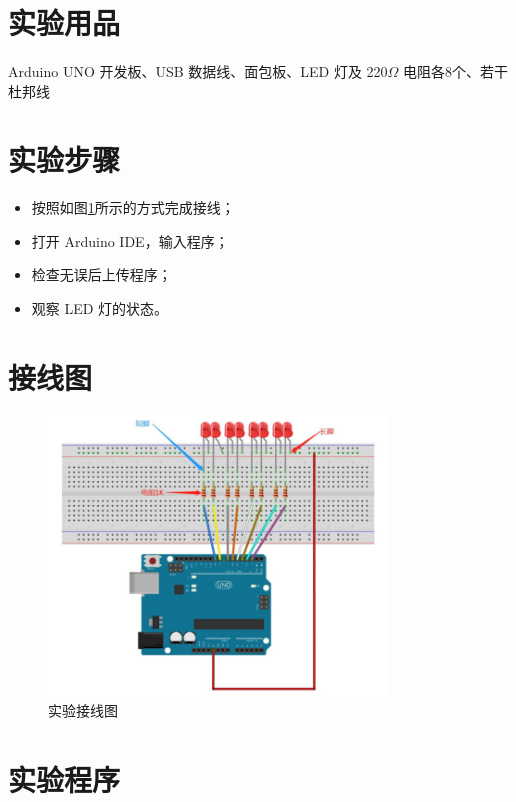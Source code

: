 \documentclass[UTF8, oneside]{ctexbook}
\begin{document}
\section{实验用品}
\paragraph{}
Arduino UNO 开发板、USB 数据线、面包板、LED 灯及 220$\Omega$ 电阻各8个、若干杜邦线

\section{实验步骤}
\begin{itemize}
    \item[(1)] 按照如图\ref{b2_line}所示的方式完成接线；
    \item[(2)] 打开 Arduino IDE，输入程序；
    \item[(3)] 检查无误后上传程序；
    \item[(4)] 观察 LED 灯的状态。
\end{itemize}

\section{接线图}
\begin{figure}[h]
    \centering
    \includegraphics[width=0.8\textwidth]{./result/basic/2/lines.png}
    \caption{实验接线图}
    \label{b2_line}
\end{figure}

\section{实验程序}

\end{document}
